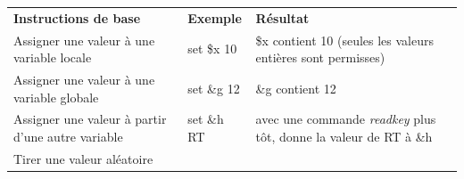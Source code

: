 \documentclass[
]{book}
\begin{document}
\begin{longtable}[]{@{}lll@{}}
\toprule
\endhead
\begin{minipage}[t]{0.32\columnwidth}\raggedright
\textbf{Instructions de base}\strut
\end{minipage} & \begin{minipage}[t]{0.20\columnwidth}\raggedright
\textbf{Exemple}\strut
\end{minipage} & \begin{minipage}[t]{0.40\columnwidth}\raggedright
\textbf{Résultat}\strut
\end{minipage}\tabularnewline
\begin{minipage}[t]{0.32\columnwidth}\raggedright
Assigner une valeur à une variable locale\strut
\end{minipage} & \begin{minipage}[t]{0.20\columnwidth}\raggedright
set \$x 10\strut
\end{minipage} & \begin{minipage}[t]{0.40\columnwidth}\raggedright
\$x contient 10 (seules les valeurs entières sont permisses)\strut
\end{minipage}\tabularnewline
\begin{minipage}[t]{0.32\columnwidth}\raggedright
Assigner une valeur à une variable globale\strut
\end{minipage} & \begin{minipage}[t]{0.20\columnwidth}\raggedright
set \&g 12\strut
\end{minipage} & \begin{minipage}[t]{0.40\columnwidth}\raggedright
\&g contient 12\strut
\end{minipage}\tabularnewline
\begin{minipage}[t]{0.32\columnwidth}\raggedright
Assigner une valeur à partir d'une autre variable\strut
\end{minipage} & \begin{minipage}[t]{0.20\columnwidth}\raggedright
set \&h RT\strut
\end{minipage} & \begin{minipage}[t]{0.40\columnwidth}\raggedright
avec une commande \emph{readkey} plus tôt, donne la valeur de RT à \&h\strut
\end{minipage}\tabularnewline
\begin{minipage}[t]{0.32\columnwidth}\raggedright
Tirer une valeur aléatoire\strut
\end{minipage} & \begin{minipage}[t]{0.20\columnwidth}\raggedright

\end{minipage}
\end{longtable}
\end{document}
